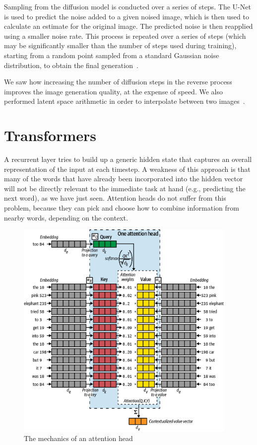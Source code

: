 Sampling from the diffusion model is conducted over a series of steps.
The U-Net is used to predict the noise added to a given noised image, which is then used to calculate an estimate for the original image.
The predicted noise is then reapplied using a smaller noise rate.
This process is repeated over a series of steps (which may be significantly smaller than the number of steps used during training), starting from a random point sampled from a standard Gaussian noise distribution, to obtain the final generation~\cite{foster2022generative}.

We saw how increasing the number of diffusion steps in the reverse process improves the image generation quality, at the expense of speed.
We also performed latent space arithmetic in order to interpolate between two images~\cite{foster2022generative}.

\section{Transformers}

A recurrent layer tries to build up a generic hidden state that captures an overall representation of the input at each timestep.
A weakness of this approach is that many of the words that have already been incorporated into the hidden vector will not be directly relevant to the immediate task at hand (e.g., predicting the next word), as we have just seen.
Attention heads do not suffer from this problem, because they can pick and choose how to combine information from nearby words, depending on the context.


\begin{figure}
	\begin{center}
		\includegraphics[width=0.95\textwidth]{figures/attention_1}
	\end{center}
	\caption{The mechanics of an attention head~\cite{foster2022generative}}\label{fig:attention_1}
\end{figure}

